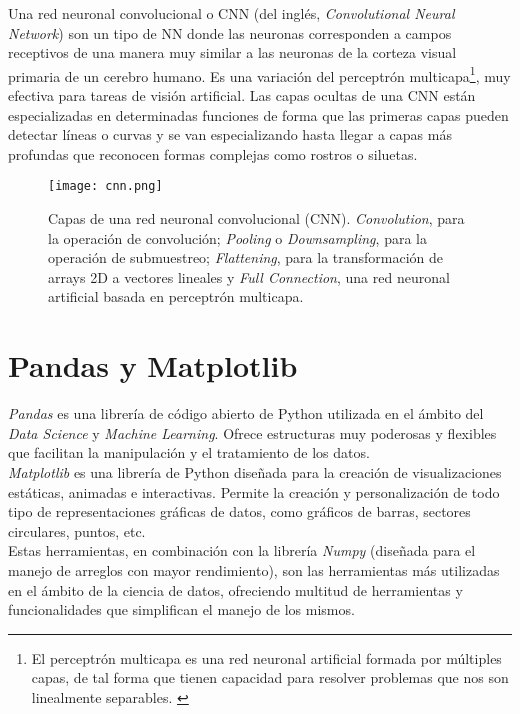 Una red neuronal convolucional o CNN (del inglés, \textit{Convolutional Neural Network}) son un tipo de NN donde las neuronas corresponden a campos receptivos de una manera muy similar a las neuronas de la corteza visual primaria de un cerebro humano. Es una variación del perceptrón multicapa\footnote{El perceptrón multicapa es una red neuronal artificial formada por múltiples capas, de tal forma que tienen capacidad para resolver problemas que nos son linealmente separables. \cite{perceptron}}, muy efectiva para tareas de visión artificial. Las capas ocultas de una CNN están especializadas en determinadas funciones de forma que las primeras capas pueden detectar líneas o curvas y se van especializando hasta llegar a capas más profundas que reconocen formas complejas como rostros o siluetas. \cite{cnn} \\

\begin{figure}[h]
	\begin{center} 
		\texttt{[image: cnn.png]}
	\end{center}
	\caption{Capas de una red neuronal convolucional (CNN). \textit{Convolution}, para la operación de convolución; \textit{Pooling} o \textit{Downsampling}, para la operación de submuestreo;  \textit{Flattening}, para la  transformación de arrays 2D a vectores lineales y \textit{Full Connection}, una red neuronal artificial basada en perceptrón multicapa. \cite{foto_cnn}}
	\label{fig:cnn}
\end{figure}

\section{Pandas y Matplotlib}

\textit{Pandas} es una librería de código abierto de Python utilizada en el ámbito del \textit{Data Science} y \textit{Machine Learning}. Ofrece estructuras muy poderosas y flexibles que facilitan la manipulación y el tratamiento de los datos. \cite{pandas}\\

\textit{Matplotlib} es una librería de Python diseñada para la creación de visualizaciones estáticas, animadas e interactivas. Permite la creación y personalización de todo tipo de representaciones gráficas de datos, como gráficos de barras, sectores circulares, puntos, etc.\cite{matplotlib}\\

Estas herramientas, en combinación con la librería \textit{Numpy} (diseñada para el manejo de arreglos con mayor rendimiento), son las herramientas más utilizadas en el ámbito de la ciencia de datos, ofreciendo multitud de herramientas y funcionalidades que simplifican el manejo de los mismos.\\



